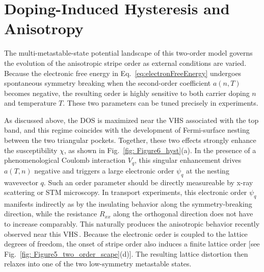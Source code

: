 \documentclass[aps,prx,article,twocolumn,amsmath,amssymb,superscriptaddress,longbibliography]{revtex4-2}
\begin{document}
\section{Doping-Induced Hysteresis and Anisotropy}\label{sec:dopingHysteresis}

The multi-metastable-state potential landscape of this two-order model governs the evolution of the anisotropic stripe order as external conditions are varied. Because the electronic free energy in Eq.~\eqref{eq:electronFreeEnergy} undergoes spontaneous symmetry breaking when the second-order coefficient $a(n,T)$ becomes negative, the resulting order is highly sensitive to both carrier doping $n$ and temperature $T$. These two parameters can be tuned precisely in experiments.

As discussed above, the DOS is maximized near the VHS associated with the top band, and this regime coincides with the development of Fermi-surface nesting between the two triangular pockets. Together, these two effects strongly enhance the susceptibility $\chi$, as shown in Fig.~\ref{fig: Figure6_hyst}(a). In the presence of a phenomenological Coulomb interaction $V_q$, this singular enhancement drives $a(T,n)$ negative and triggers a large electronic order $\psi_q$ at the nesting wavevector $q$. Such an order parameter should be directly measureable by x-ray scattering or STM microscopy. In transport experiments, this electronic order $\psi_q$ manifests indirectly as by the insulating behavior along the symmetry-breaking direction, while the resistance $R_{xx}$ along the orthogonal direction does not have to increase comparably. This naturally produces the anisotropic behavior recently observed near this VHS\,\cite{zhao2026hysteretical}. Because the electronic order is coupled to the lattice degrees of freedom, the onset of stripe order also induces a finite lattice order [see Fig.~\ref{fig: Figure5_two_order_scape}(d)]. The resulting lattice distortion then relaxes into one of the two low-symmetry metastable states.
\end{document}
